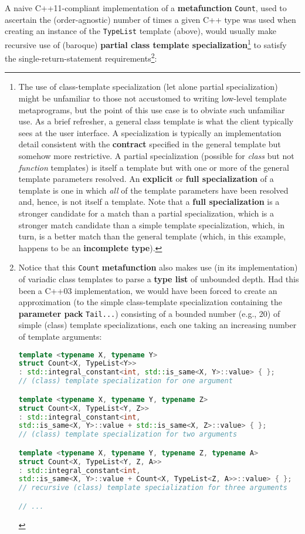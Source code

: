 \noindent A naive C++11-compliant implementation of a \textbf{metafunction}
\texttt{Count}, used to ascertain the (order-agnostic) number of times a
given C++ type was used when creating an instance of the
\texttt{TypeList} template (above), would usually make recursive use of
(baroque) \textbf{partial class template
specialization}{\cprotect\footnote{The use of class-template
specialization (let alone partial specialization) might be unfamiliar
to those not accustomed to writing low-level template metaprograms, but the point of this use case is to obviate such
unfamiliar use. As a brief refresher, a general class template is what
the client typically sees at the user interface. A specialization is
typically an implementation detail consistent with the
\textbf{contract} specified in the general template but somehow more
restrictive. A partial specialization (possible for \emph{class} but
not \emph{function} templates) is itself a template but with one or
more of the general template parameters resolved. An \textbf{explicit}
or \textbf{full specialization} of a template is one in which
\emph{all} of the template parameters have been resolved and, hence, is
not itself a template. Note that a \textbf{full specialization} is a
stronger candidate for a match than a partial specialization, which is
a stronger match candidate than a simple template specialization,
which, in turn, is a better match than the general template (which, in
this example, happens to be an \textbf{incomplete type}).}} to satisfy the single-return-statement requirements{\cprotect\footnote{Notice that this \texttt{Count}
\textbf{metafunction} also makes use (in its implementation) of
variadic class templates to parse a \textbf{type list} of unbounded
depth. Had this been a C++03 implementation, we would have been forced
to create an approximation (to the simple class-template
specialization containing the \textbf{parameter pack}
\texttt{Tail...}) consisting of a bounded number (e.g., 20) of simple
(class) template specializations, each one taking an increasing number
of template arguments:

\begin{lstlisting}[language=C++, basicstyle={\ttfamily\footnotesize}]
template <typename X, typename Y>
struct Count<X, TypeList<Y>>
: std::integral_constant<int, std::is_same<X, Y>::value> { };
// (class) template specialization for one argument

template <typename X, typename Y, typename Z>
struct Count<X, TypeList<Y, Z>>
: std::integral_constant<int,
std::is_same<X, Y>::value + std::is_same<X, Z>::value> { };
// (class) template specialization for two arguments

template <typename X, typename Y, typename Z, typename A>
struct Count<X, TypeList<Y, Z, A>>
: std::integral_constant<int,
std::is_same<X, Y>::value + Count<X, TypeList<Z, A>>::value> { };
// recursive (class) template specialization for three arguments

// ...
\end{lstlisting}
}}:

